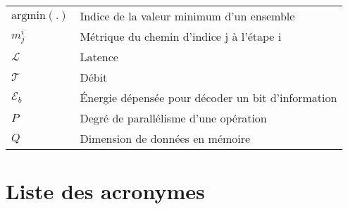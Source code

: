 {\begin{center}
\begin{longtable}{ p{}  p{} }
$\text{argmin}(.)$      & Indice de la valeur minimum d'un ensemble               \\
$m_j^i$                 & Métrique du chemin d'indice j à l'étape i               \\
$\mathcal{L}$           & Latence                                                 \\
$\mathcal{T}$           & Débit                                                   \\
$\mathcal{E}_b$         & \'Energie dépensée pour décoder un bit d'information    \\
$P$                     & Degré de parallélisme d'une opération                   \\
$Q$                     & Dimension de données en mémoire                         \\

\end{longtable}

\end{center}


\chapter*{Liste des acronymes}

}
{

}


